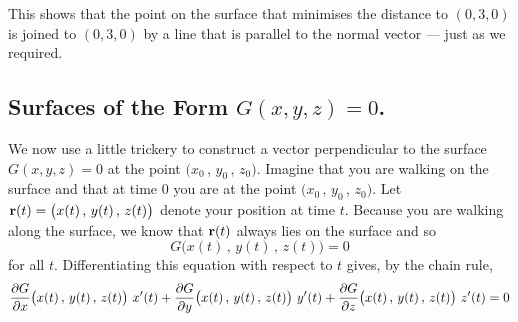 \begin{eg}[Optional]
This shows that the point on the surface that minimises the distance 
to $(0,3,0)$ is joined to $(0,3,0)$ by a line that is parallel to the 
normal vector --- just as we required. 

\end{eg}

\subsection{Surfaces of the Form $G(x,y,z)=0$.}
We now use  a little trickery to construct a vector perpendicular to 
the surface $G(x,y,z)=0$ at the point $\big(x_0\,,\,y_0\,,\,z_0\big)$.
Imagine that you are walking on the surface and that at time $0$
you are at the point $\big(x_0\,,\,y_0\,,\,z_0\big)$. Let $\mathbf{r}(t)
=\big(x(t)\,,\,y(t)\,,\,z(t)\big)$ denote your position at time $t$.
Because you are walking along the surface, we know that $\mathbf{r}(t)$ always 
lies on the surface and so
\begin{equation*}
G\big( x(t)\,,\,y(t)\,,\,z(t)\big)=0
\end{equation*}
for all $t$. Differentiating this equation with respect to $t$ gives,
by the chain rule,
\begin{equation*}
\pdiff{G}{x}\big( x(t)\,,\,y(t)\,,\,z(t)\big)\ x'(t)
+\pdiff{G}{y}\big( x(t)\,,\,y(t)\,,\,z(t)\big)\ y'(t)
+\pdiff{G}{z}\big( x(t)\,,\,y(t)\,,\,z(t)\big)\ z'(t) = 0
\end{equation*}
